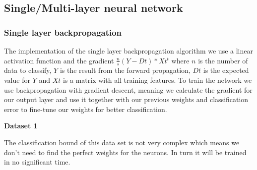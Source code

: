 \documentclass[a4paper,12pt]{article}
\begin{document}
\subsection{Single/Multi-layer neural network}

\subsubsection{Single layer backpropagation}

The implementation of the single layer backpropagation algorithm we use a linear activation function and the gradient $\frac{n}{s}(Y-Dt)*Xt^t$ where $n$ is the number of data to classify, $Y$ is the result from the forward propagation, $Dt$ is the expected value for $Y$ and $Xt$ is a matrix with all training features. To train the network we use backpropagation with gradient descent, meaning we calculate the gradient for our output layer and use it together with our previous weights and classification error to fine-tune our weights for better classification.


\noindent \textbf{Dataset 1}

The classification bound of this data set is not very complex which means we don't need to find the perfect weights for the neurons. In turn it will be trained in no significant time.
\end{document}
